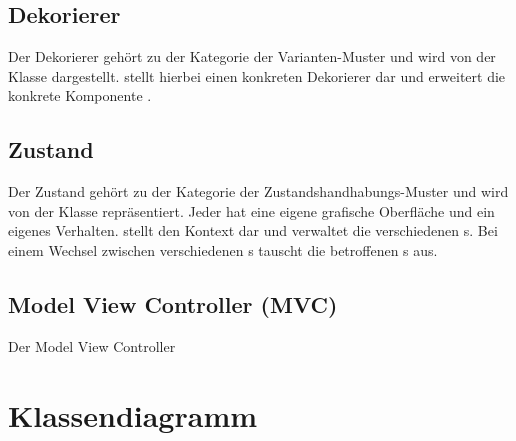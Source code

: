 \subsection{Dekorierer}
Der Dekorierer gehört zu der Kategorie der Varianten-Muster und wird von der Klasse  dargestellt. 
 stellt hierbei einen konkreten Dekorierer dar und erweitert die konkrete Komponente .

\subsection{Zustand}
Der Zustand gehört zu der Kategorie der Zustandshandhabungs-Muster und wird von der Klasse  repräsentiert. Jeder  hat eine eigene grafische Oberfläche und ein eigenes Verhalten.
 stellt den Kontext dar und verwaltet die verschiedenen s. Bei einem Wechsel zwischen verschiedenen s tauscht  die betroffenen s aus.

\subsection{Model View Controller (MVC)}
Der Model View Controller

\section{Klassendiagramm}

